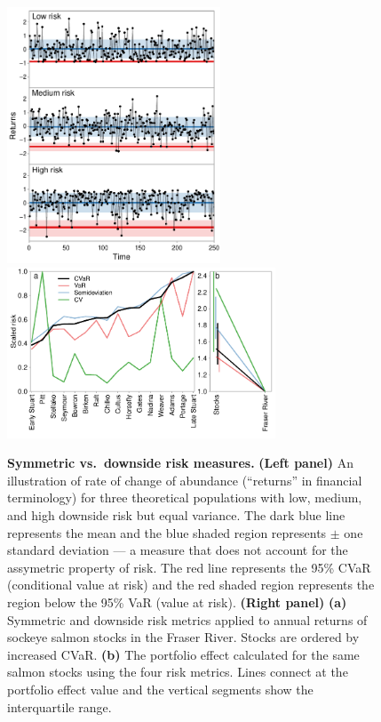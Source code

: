 \begin{figure}[htbp]
\centering
\includegraphics[height=3.0in]{skewness-abundance.pdf}
\includegraphics[height=2.0in]{compare-risk-and-portfolio-scale.pdf} \caption{
  \textbf{Symmetric vs.\ downside risk measures.} \textbf{(Left panel)} An
  illustration of rate of change of abundance (``returns'' in financial
  terminology) for three theoretical populations with low, medium, and high
  downside risk but equal variance. The dark blue line represents the mean and
  the blue shaded region represents $\pm$ one standard deviation --- a measure
  that does not account for the assymetric property of risk. The red line
  represents the 95\% CVaR (conditional value at risk) and the red shaded
  region represents the region below the 95\% VaR (value at risk).
  \textbf{(Right panel)} \textbf{(a)} Symmetric and downside risk metrics
  applied to annual returns of sockeye salmon stocks in the Fraser River.
  Stocks are ordered by increased CVaR. \textbf{(b)} The portfolio effect
  calculated for the same salmon stocks using the four risk metrics. Lines
  connect at the portfolio effect value and the vertical segments show the
  interquartile range.} \label{fig:risk}
\end{figure}
